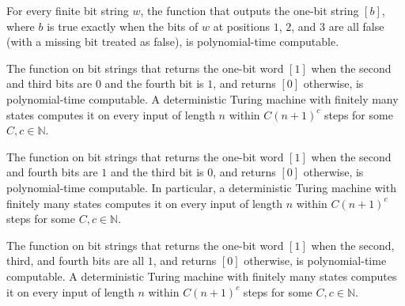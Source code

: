 \begin{theorem}
\label{Randomized.PIT.polyTimeComputable_isVarW}
\leanok
{}
For every finite bit string $w$, the function that outputs the one-bit string $[b]$,
where $b$ is true exactly when the bits of $w$ at positions $1$, $2$, and $3$ are all
false (with a missing bit treated as false), is polynomial-time computable.
\end{theorem}

\begin{theorem}
\label{Randomized.PIT.polyTimeComputable_isOneW}
\leanok
{}
The function on bit strings that returns the one-bit word $[1]$ when the second and
third bits are $0$ and the fourth bit is $1$, and returns $[0]$ otherwise, is
polynomial-time computable. A deterministic Turing machine with finitely many states
computes it on every input of length $n$ within $C(n+1)^c$ steps for some
$C,c\in\mathbb{N}$.
\end{theorem}

\begin{theorem}
\label{Randomized.PIT.polyTimeComputable_isAddW}
\leanok
{}
The function on bit strings that returns the one-bit word $[1]$ when the second and
fourth bits are $1$ and the third bit is $0$, and returns $[0]$ otherwise, is
polynomial-time computable. In particular, a deterministic Turing machine with finitely
many states computes it on every input of length $n$ within $C(n+1)^c$ steps for some
$C,c\in\mathbb{N}$.
\end{theorem}

\begin{theorem}
\label{Randomized.PIT.polyTimeComputable_isSubW}
\leanok
{}
The function on bit strings that returns the one-bit word $[1]$ when the second, third,
and fourth bits are all $1$, and returns $[0]$ otherwise, is polynomial-time computable.
A deterministic Turing machine with finitely many states computes it on every input of
length $n$ within $C(n+1)^c$ steps for some $C,c\in\mathbb{N}$.
\end{theorem}

